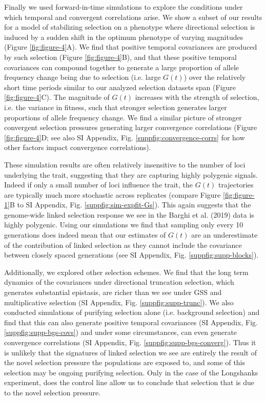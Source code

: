 \documentclass[9pt,twocolumn,twoside]{pnas-new}
\begin{document}
Finally we used forward-in-time simulations to explore the conditions under
which temporal and convergent correlations arise. We show a subset of our
results for a model of stabilizing selection on a phenotype where directional
selection is induced by a sudden shift in the optimum phenotype of varying
magnitudes (Figure \ref{fig:figure-4}A). We find that positive temporal
covariances are produced by such selection (Figure \ref{fig:figure-4}B), and
that these positive temporal covariances can compound together to generate a
large proportion of allele frequency change being due to selection (i.e. large
$G(t)$) over the relatively short time periods similar to our analyzed
selection datasets span (Figure \ref{fig:figure-4}C).  The magnitude of
$G(t)$ increases with the strength of selection, i.e. the variance in
fitness, such that stronger selection generates larger proportions of allele
frequency change.  We find a similar picture of stronger convergent selection
pressures generating larger convergence correlations (Figure
\ref{fig:figure-4}D; see also SI Appendix, Fig.
\ref{suppfig:convergence-corrs} for how other factors impact convergence
correlations). 

These simulation results are often relatively insensitive to the number of loci
underlying the trait, suggesting that they are capturing highly polygenic
signals.  Indeed if only a small number of loci influence the trait, the $G(t)$
trajectories are typically much more stochastic across replicates (compare
Figure \ref{fig:figure-1}B to SI Appendix, Fig.
\ref{suppfig:sim-expfit-Gs}). This again suggests that the genome-wide linked
selection response we see in the Barghi et al. (2019) data is highly
polygenic.  Using our simulations we find that sampling only every 10
generations does indeed mean that our estimates of $G(t)$ are an underestimate
of the contribution of linked selection as they cannot include the covariance
between closely spaced generations (see SI Appendix, Fig.
\ref{suppfig:supp-blocks}).

Additionally, we explored other selection schemes. We find that the long term
dynamics of the covariances under directional truncation selection, which
generates substantial epistasis, are richer than we see under GSS and
multiplicative selection (SI Appendix, Fig.
\ref{suppfig:supp-trunc}).  We also conducted simulations of purifying
selection alone (i.e. background selection) and find that this can also
generate positive temporal covariances (SI Appendix, Fig.
\ref{suppfig:supp-bgs-covs}) and under some circumstances, can even generate
convergence correlations (SI Appendix, Fig.
\ref{suppfig:supp-bgs-converg}). Thus it is unlikely that the signatures of
linked selection we see are entirely the result of the novel selection pressure
the populations are exposed to, and some of this selection may be ongoing
purifying selection. Only in the case of the Longshanks experiment, does the
control line allow us to conclude that selection that is due to the novel
selection pressure.
\end{document}
